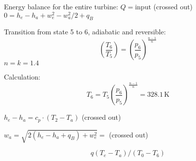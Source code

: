 Energy balance for the entire turbine:  
\( Q = \text{input} \) (crossed out)  
\( 0 = h_e - h_a + w_e^2 - w_a^2 / 2 + q_B \)  

Transition from state 5 to 6, adiabatic and reversible:  
\[
\left( \frac{T_6}{T_5} \right) = \left( \frac{p_6}{p_5} \right)^{\frac{n-1}{n}}
\]  
\( n = k = 1.4 \)  

Calculation:  
\[
T_6 = T_5 \left( \frac{p_6}{p_5} \right)^{\frac{n-1}{n}} = 328.1 \, \text{K}
\]  

\( h_e - h_a = c_p \cdot (T_2 - T_a) \) (crossed out)  

\( w_a = \sqrt{2(h_e - h_a + q_B) + w_e^2} = \) (crossed out)  

\[
q(T_e - T_a) / (T_0 - T_6)
\]